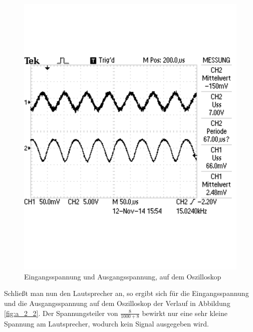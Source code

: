 \documentclass[12pt,a4paper]{article}
\begin{document}
\begin{figure}[H] 
  \centering
    \includegraphics[scale = 0.7]{a_2_1.pdf}
  	\caption[Eingangsspannung und Ausgangsspannung, auf dem Oszilloskop]{Eingangsspannung und Ausgangsspannung, auf dem Oszilloskop}
  \label{fig:a_2_1}
\end{figure}

Schließt man nun den Lautsprecher an, so ergibt sich für die Eingangsspannung und die Ausgangsspannung auf dem Oszilloskop der Verlauf in Abbildung \ref{fig:a_2_2}. Der Spannungsteiler von $\frac{8}{1000 + 8}$ bewirkt nur eine sehr kleine Spannung am Lautsprecher, wodurch kein Signal ausgegeben wird.
\end{document}
